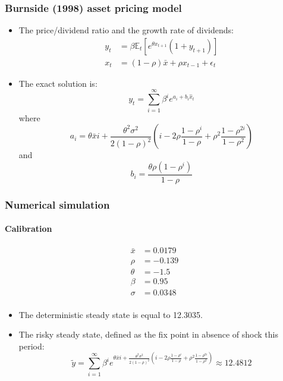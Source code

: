 \documentclass{beamer}
\begin{document}
\begin{frame}
  \frametitle{Burnside (1998) asset pricing model}

\begin{itemize}

  \item The price/dividend ratio and the growth rate of dividends:
  \[
    \begin{split}
      y_t &= \beta \mathbb E_t\left[e^{\theta x_{t+1}}\left(1+y_{t+1}\right)\right]\\
      x_t &= (1-\rho)\bar x + \rho x_{t-1}+\epsilon_t
    \end{split}
  \]

  \item The exact solution is:
\[
    y_t = \sum_{i=1}^\infty \beta^i e^{a_i+b_i\hat x_t}
\]
where
\[
    a_i = \theta \bar x i +
\frac{\theta^2\sigma^2}{2(1-\rho)^2}\left(i-2\rho\frac{1-\rho^i}{1-\rho}+\rho^2\frac{1-\rho^{2i}}{1-\rho^2}\right)
\]
and
\[
b_i = \frac{\theta\rho\left(1-\rho^i\right)}{1-\rho}
\]

\end{itemize}

\end{frame}


\begin{frame}
  \frametitle{Numerical simulation}
   \framesubtitle{Calibration}

\begin{align*}
  \bar x &= 0.0179\\
  \rho &=  -0.139\\
  \theta &= -1.5\\
  \beta &= 0.95\\
  \sigma &= 0.0348\\
\end{align*}

\medskip

\begin{itemize}
\item The deterministic steady state is equal to 12.3035.\newline
\item The risky steady state, defined as the fix point in absence of
  shock this period:
\[
\widetilde y = \sum_{i=1}^\infty \beta^i e^{\theta \bar x i +
\frac{\theta^2\sigma^2}{2(1-\rho)^2}\left(i-2\rho\frac{1-\rho^i}{1-\rho}+\rho^2\frac{1-\rho^{2i}}{1-\rho^2}\right)}\approx 12.4812
\]

\end{itemize}

\end{frame}
\end{document}
